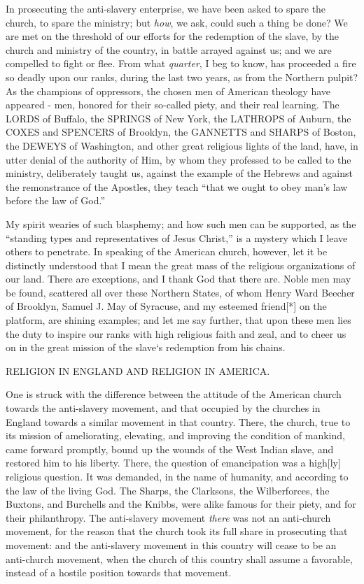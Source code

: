 In prosecuting the anti-slavery enterprise, we have been asked to spare the church, to spare the ministry; but \textit{how}, we ask, could such a thing be done? We are met on the threshold of our efforts for the redemption of the slave, by the church and ministry of the country, in battle arrayed against us; and we are compelled to fight or flee. From what \textit{quarter}, I beg to know, has proceeded a fire so deadly upon our ranks, during the last two years, as from the Northern pulpit? As the champions of oppressors, the chosen men of American theology have appeared - men, honored for their so-called piety, and their real learning. The LORDS of Buffalo, the SPRINGS of New York, the LATHROPS of Auburn, the COXES and SPENCERS of Brooklyn, the GANNETTS and SHARPS of Boston, the DEWEYS of Washington, and other great religious lights of the land, have, in utter denial of the authority of Him, by whom they professed to be called to the ministry, deliberately taught us, against the example of the Hebrews and against the remonstrance of the Apostles, they teach “that we ought to obey man’s law before the law of God.”\par

My spirit wearies of such blasphemy; and how such men can be supported, as the “standing types and representatives of Jesus Christ,” is a mystery which I leave others to penetrate. In speaking of the American church, however, let it be distinctly understood that I mean the great mass of the religious organizations of our land. There are exceptions, and I thank God that there are. Noble men may be found, scattered all over these Northern States, of whom Henry Ward Beecher of Brooklyn, Samuel J. May of Syracuse, and my esteemed friend[*] on the platform, are shining examples; and let me say further, that upon these men lies the duty to inspire our ranks with high religious faith and zeal, and to cheer us on in the great mission of the slave‘s redemption from his chains.\par

RELIGION IN ENGLAND AND RELIGION IN AMERICA.\par

One is struck with the difference between the attitude of the American church towards the anti-slavery movement, and that occupied by the churches in England towards a similar movement in that country. There, the church, true to its mission of ameliorating, elevating, and improving the condition of mankind, came forward promptly, bound up the wounds of the West Indian slave, and restored him to his liberty. There, the question of emancipation was a high[ly] religious question. It was demanded, in the name of humanity, and according to the law of the living God. The Sharps, the Clarksons, the Wilberforces, the Buxtons, and Burchells and the Knibbs, were alike famous for their piety, and for their philanthropy. The anti-slavery movement \textit{there} was not an anti-church movement, for the reason that the church took its full share in prosecuting that movement: and the anti-slavery movement in this country will cease to be an anti-church movement, when the church of this country shall assume a favorable, instead of a hostile position towards that movement.\par

